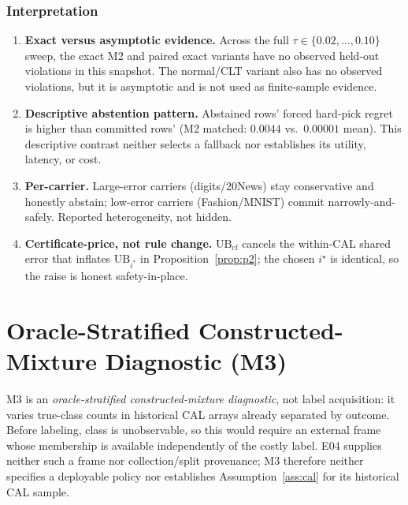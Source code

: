 \documentclass{article}
\begin{document}
\subsubsection{Interpretation}
\begin{enumerate}
\item \textbf{Exact versus asymptotic evidence.} Across the full $\tau\in\{0.02,\dots,0.10\}$
sweep, the exact M2 and paired exact variants have no observed held-out violations in this
snapshot. The normal/CLT variant also has no observed violations, but it is asymptotic and is not used
as finite-sample evidence.
\item \textbf{Descriptive abstention pattern.} Abstained rows' forced hard-pick regret is
higher than committed rows' (M2 matched: $0.0044$ vs.\ $0.00001$ mean). This descriptive
contrast neither selects a fallback nor establishes its utility, latency, or cost.
\item \textbf{Per-carrier.} Large-error carriers (digits/20News) stay conservative and
honestly abstain; low-error carriers (Fashion/MNIST) commit narrowly-and-safely. Reported
heterogeneity, not hidden.
\item \textbf{Certificate-price, not rule change.} $\mathrm{UB}_{\mathrm{cf}}$ cancels the
within-CAL shared error that inflates $\mathrm{UB}_{i^*}$ in Proposition~\ref{prop:p2}; the
chosen $i^\star$ is identical, so the raise is honest safety-in-place.
\end{enumerate}

\section{Oracle-Stratified Constructed-Mixture Diagnostic (M3)}
\label{sec:m3}

M3 is an \emph{oracle-stratified constructed-mixture diagnostic}, not label acquisition: it
varies true-class counts in historical CAL arrays already separated by outcome. Before labeling,
class is unobservable, so this would require an external frame whose membership is available
independently of the costly label. E04 supplies neither such a frame nor collection/split
provenance; M3 therefore neither specifies a deployable policy nor establishes
Assumption~\ref{ass:cal} for its historical CAL sample.
\end{document}

